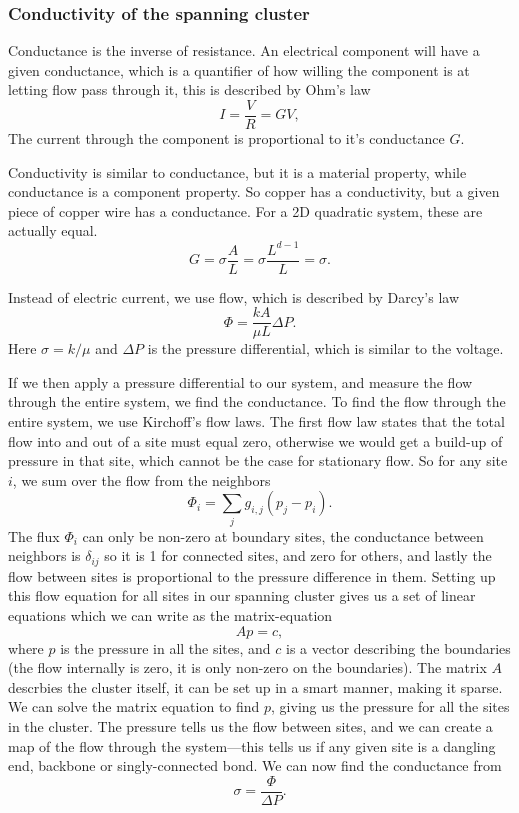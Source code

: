 \documentclass[a4paper, 11pt, notitlepage, english]{article}
\begin{document}
\subsubsection*{Conductivity of the spanning cluster}

Conductance is the inverse of resistance. An electrical component will have a given conductance, which is a quantifier of how willing the component is at letting flow pass through it, this is described by Ohm's law
$$I = \frac{V}{R} = GV,$$
The current through the component is proportional to it's conductance $G$.

Conductivity is similar to conductance, but it is a material property, while conductance is a component property. So copper has a conductivity, but a given piece of copper wire has a conductance. For a 2D quadratic system, these are actually equal.
$$G = \sigma\frac{A}{L} = \sigma\frac{L^{d-1}}{L} = \sigma.$$

Instead of electric current, we use flow, which is described by Darcy's law
$$\Phi = \frac{k A}{\mu L} \Delta P.$$
Here $\sigma = k/\mu$ and $\Delta P$ is the pressure differential, which is similar to the voltage.

If we then apply a pressure differential to our system, and measure the flow through the entire system, we find the conductance. To find the flow through the entire system, we use Kirchoff's flow laws. The first flow law states that the total flow into and out of a site must equal zero, otherwise we would get a build-up of pressure in that site, which cannot be the case for stationary flow. So for any site $i$, we sum over the flow from the neighbors
$$\Phi_i = \sum_j g_{i,j} (p_j -p_i).$$
The flux $\Phi_i$ can only be non-zero at boundary sites, the conductance between neighbors is $\delta_{ij}$ so it is 1 for connected sites, and zero for others, and lastly the flow between sites is proportional to the pressure difference in them. Setting up this flow equation for all sites in our spanning cluster gives us a set of linear equations which we can write as the matrix-equation
$$Ap = c,$$
where $p$ is the pressure in all the sites, and $c$ is a vector describing the boundaries (the flow internally is zero, it is only non-zero on the boundaries). The matrix $A$ descrbies the cluster itself, it can be set up in a smart manner, making it sparse. We can solve the matrix equation to find $p$, giving us the pressure for all the sites in the cluster. The pressure tells us the flow between sites, and we can create a map of the flow through the system---this tells us if any given site is a dangling end, backbone or singly-connected bond. We can now find the conductance from
$$\sigma = \frac{\Phi}{\Delta P}.$$
\end{document}
